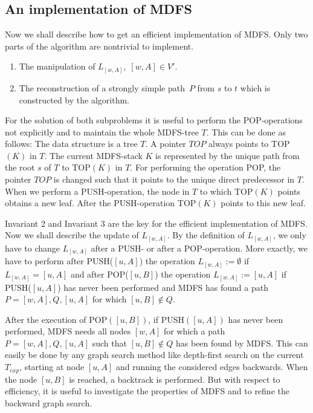 \documentclass[12pt,twoside,a4paper]{article}
\begin{document}
\subsection{An implementation of MDFS} \label{MDFSim}

Now we shall describe how to get an efficient implementation of MDFS. Only 
two parts of the algorithm are nontrivial to implement.
\begin{enumerate}
\item The manipulation of $L_{[w,A]},\; [w,A]\in V'$.
\item The reconstruction of a strongly simple path~$P$ from $s$ to $t$ which
 is constructed by the algorithm.
\end{enumerate}
For the solution of both subproblems it is useful to perform the
POP-operations not explicitly and to maintain the whole MDFS-tree $T$.
This can be done as follows:
The data structure is a tree $T$. A pointer $TOP$ always points to TOP$(K)$ 
in $T$. The current MDFS-stack $K$ is represented by the unique path from the 
root $s$ of $T$ to TOP$(K)$ in $T$. For performing the operation POP, the
pointer $TOP$ is changed such that it points to the unique direct predecessor 
in $T$. When we perform a PUSH-operation, the node in $T$ to which TOP$(K)$ 
points obtains a new leaf. After the PUSH-operation TOP$(K)$ points to this
new leaf.

Invariant 2 and Invariant 3 are the key for the efficient implementation of 
MDFS. Now we shall describe the update of $L_{[w,A]}$. By the definition of
$L_{[w,A]}$, we only have to change $L_{[w,A]}$ after a PUSH- or after
a POP-operation. More exactly, we have to perform after PUSH($[u,A]$) the 
operation $L_{[w,A]} := \emptyset$ if $L_{[w,A]} = [u,A]$ and after POP($[u,B]$)
the operation $L_{[w,A]} := [u,A]$ if PUSH($[u,A]$) has never been performed and 
MDFS has found a path $P = [w,A],Q,[u,A]$ for which $[u,B] \not\in Q$.

After the execution of POP$([u,B])$, if PUSH$([u,A])$ has never been performed, 
MDFS needs all nodes $[w,A]$ for which a path $P = [w,A],Q,[u,A]$ such that 
$[u,B] \not\in Q$ has been found by MDFS.
This can easily be done by any graph search method like depth-first search on the
current $T_{exp}$, starting at node $[u,A]$ and running the considered edges backwards. 
When the node $[u,B]$ is reached, a backtrack is performed. But with respect
to efficiency, it is useful to investigate the properties of MDFS and to
refine the backward graph search. 
\end{document}
